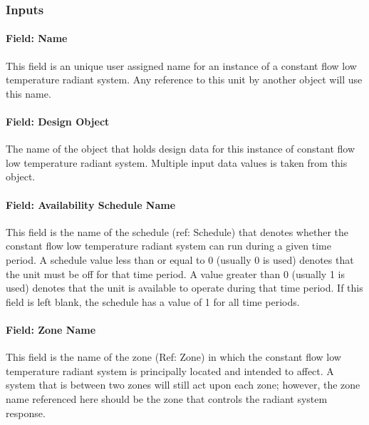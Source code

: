 \subsubsection{Inputs}\label{inputs-6-019}

\paragraph{Field: Name}\label{field-name-6-016}

This field is an unique user assigned name for an instance of a constant flow low temperature radiant system. Any reference to this unit by another object will use this name.

\paragraph{Field: Design Object}\label{DesignObjectName}

The name of the object that holds design data for this instance of constant flow low temperature radiant system. Multiple input data values is taken from this object.

\paragraph{Field: Availability Schedule Name}\label{field-availability-schedule-name-6-003}

This field is the name of the schedule (ref: Schedule) that denotes whether the constant flow low temperature radiant system can run during a given time period. A schedule value less than or equal to 0 (usually 0 is used) denotes that the unit must be off for that time period. A value greater than 0 (usually 1 is used) denotes that the unit is available to operate during that time period. If this field is left blank, the schedule has a value of 1 for all time periods.

\paragraph{Field: Zone Name}\label{field-zone-name-1-007}

This field is the name of the zone (Ref: Zone) in which the constant flow low temperature radiant system is principally located and intended to affect. A system that is between two zones will still act upon each zone; however, the zone name referenced here should be the zone that controls the radiant system response.

